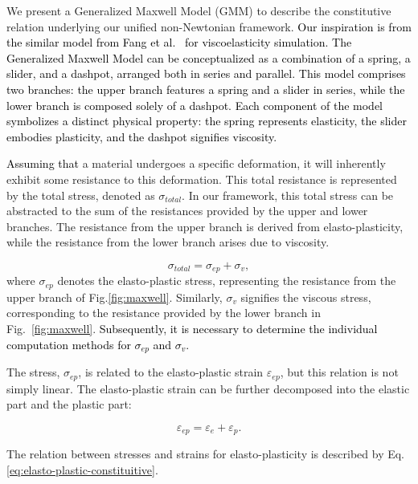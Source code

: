 \documentclass[10pt,journal,compsoc]{IEEEtran}
\newcommand{\revised}[1]{{\textcolor{black}{#1}}}
\begin{document}
We present a Generalized Maxwell Model (GMM) to describe the constitutive relation underlying our unified non-Newtonian framework. \revised{Our inspiration is from the similar model from Fang et al.~\cite{Fang2019-sillyRubber} for viscoelasticity simulation. The Generalized Maxwell Model can be conceptualized as a combination of a spring, a slider, and a dashpot, arranged both in series and parallel. This model comprises two branches: the upper branch features a spring and a slider in series, while the lower branch is composed solely of a dashpot. Each component of the model symbolizes a distinct physical property: the spring represents elasticity, the slider embodies plasticity, and the dashpot signifies viscosity.}

\revised{Assuming that} a material undergoes a specific deformation, it will inherently exhibit some resistance to this deformation. This total resistance is represented by the total stress, denoted as $\sigma_{total}$. In our framework, this total stress can be abstracted to the sum of the resistances provided by the upper and lower branches. The resistance from the upper branch is derived from elasto-plasticity, while the resistance from the lower branch arises due to viscosity.

\begin{equation}
	\sigma_{total} = \sigma_{ep} + \sigma_v,
\end{equation}
where $\sigma_{ep}$ denotes the elasto-plastic stress, representing the resistance from the upper branch of Fig.\ref{fig:maxwell}. Similarly, $\sigma_v$ signifies the viscous stress, corresponding to the resistance provided by the lower branch in Fig.~\ref{fig:maxwell}.
\revised{Subsequently, it is necessary to determine the individual computation methods for $\sigma_{ep}$ and $\sigma_v$.}



The stress, $\sigma_{ep}$, is related to the elasto-plastic strain $\varepsilon_{ep}$, but this relation is not simply linear. The elasto-plastic strain can be further decomposed into the elastic part and the plastic part:


\begin{equation}
	\varepsilon_{ep} = \varepsilon_{e} + \varepsilon_{p}. \label{eq:addition_law_strain}
\end{equation}

The relation between stresses and strains for elasto-plasticity is described by Eq.\ref{eq:elasto-plastic-constituitive}.
\end{document}
